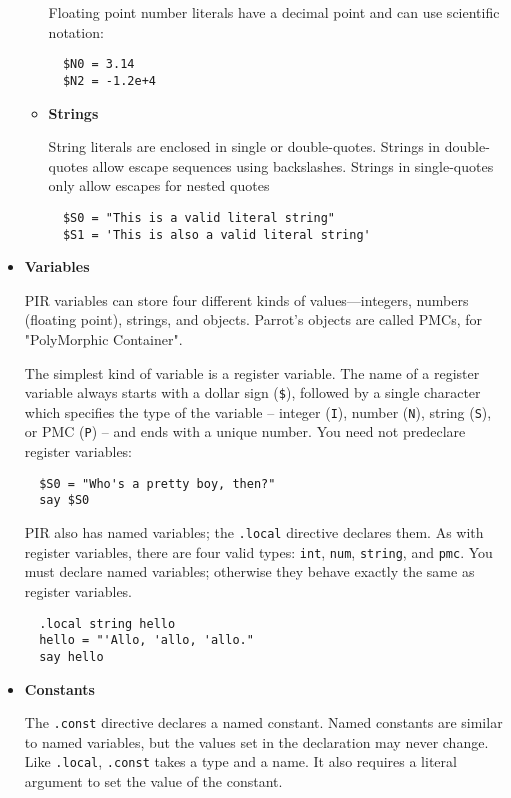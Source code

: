\begin{itemize}
\begin{itemize}
Floating point number literals have a decimal point and can use scientific notation:

\begin{verbatim}
  $N0 = 3.14
  $N2 = -1.2e+4
\end{verbatim}

\item {\bf Strings }

String literals are enclosed in single or double-quotes.
Strings in double-quotes allow escape sequences using backslashes.
Strings in single-quotes only allow escapes for nested quotes

\begin{verbatim}
  $S0 = "This is a valid literal string"
  $S1 = 'This is also a valid literal string'
\end{verbatim}
\end{itemize}

\item {\bf Variables }

PIR variables can store four different kinds of values—integers,
numbers (floating point), strings, and objects. Parrot's objects
are called PMCs, for "PolyMorphic Container".

The simplest kind of variable is a register variable. The name of
a register variable always starts with a dollar sign (\verb|$|), followed
by a single character which specifies the type of the variable --
integer (\verb|I|), number (\verb|N|), string (\verb|S|), or PMC (\verb|P|) 
-- and ends with a unique number. You need not predeclare register variables:

\begin{verbatim}
  $S0 = "Who's a pretty boy, then?"
  say $S0
\end{verbatim}

PIR also has named variables; the \verb|.local| directive declares them.
As with register variables, there are four valid types: \verb|int|, \verb|num|,
\verb|string|, and \verb|pmc|. You must declare named variables; otherwise they
behave exactly the same as register variables.

\begin{verbatim}
  .local string hello
  hello = "'Allo, 'allo, 'allo."
  say hello
\end{verbatim}

\item {\bf Constants }

The \verb|.const| directive declares a named constant. Named constants are
similar to named variables, but the values set in the declaration
may never change. Like \verb|.local|, \verb|.const| takes a type and a name. It
also requires a literal argument to set the value of the constant.


\end{itemize}
